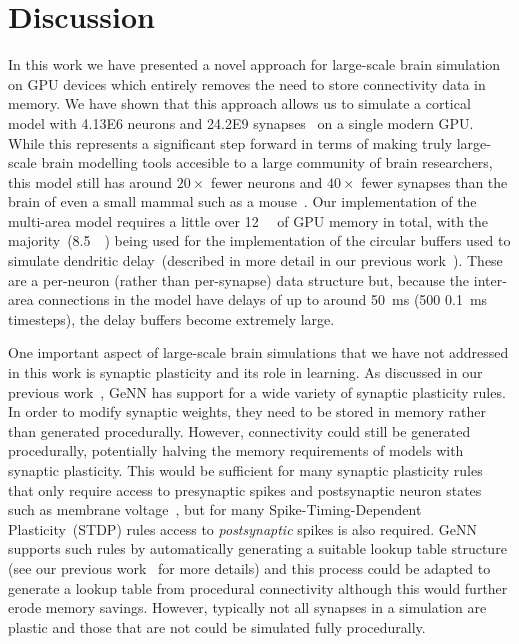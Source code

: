 \documentclass[9pt,twocolumn,twoside,lineno]{pnas-new}
\begin{document}
\section*{Discussion}
In this work we have presented a novel approach for large-scale brain simulation on GPU devices which entirely removes the need to store connectivity data in memory.
We have shown that this approach allows us to simulate a cortical model with \num{4.13E6} neurons and \num{24.2E9} synapses~\citep{Schmidt2018a,Schmidt2018} on a single modern GPU.
While this represents a significant step forward in terms of making truly large-scale brain modelling tools accesible to a large community of brain researchers, this model still has around $20\times$ fewer neurons and $40\times$ fewer synapses than the brain of even a small mammal such as a mouse~\citep{Herculano-Houzel2010}.
Our implementation of the multi-area model requires a little over \SI{12}{\giga\byte} of GPU memory in total, with the majority~(\SI{8.5}{\giga\byte}) being used for the implementation of the circular buffers used to simulate dendritic delay~(described in more detail in our previous work~\citep{Knight2018}).
These are a per-neuron (rather than per-synapse) data structure but, because the inter-area connections in the model have delays of up to around \SI{50}{\milli\second} (500 \SI{0.1}{\milli\second} timesteps), the delay buffers become extremely large.

One important aspect of large-scale brain simulations that we have not addressed in this work is synaptic plasticity and its role in learning.
As discussed in our previous work~\citep{Knight2018}, GeNN has support for a wide variety of synaptic plasticity rules.
In order to modify synaptic weights, they need to be stored in memory rather than generated procedurally.
However, connectivity could still be generated procedurally, potentially halving the memory requirements of models with synaptic plasticity.
This would be sufficient for many synaptic plasticity rules that only require access to presynaptic spikes and postsynaptic neuron states such as membrane voltage~\cite{Brader2007,Clopath2010c}, but for many Spike-Timing-Dependent Plasticity~(STDP) rules access to \emph{postsynaptic} spikes is also required.
GeNN supports such rules by automatically generating a suitable lookup table structure (see our previous work~\citep{Knight2018} for more details) and this process could be adapted to generate a lookup table from procedural connectivity although this would further erode memory savings.
However, typically not all synapses in a simulation are plastic and those that are not could be simulated fully procedurally.
\end{document}
